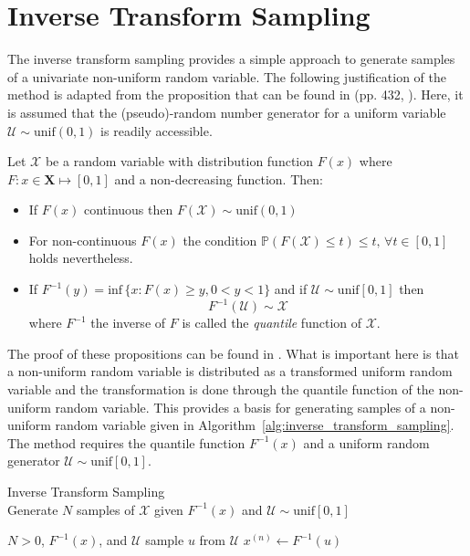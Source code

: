 \section{Inverse Transform Sampling}\label{app:its}

The inverse transform sampling provides a simple approach to generate samples of a univariate non-uniform random variable.
The following justification of the method is adapted from the proposition that can be found in (pp. 432, \cite{Lange2010}).
Here, it is assumed that the (pseudo)-random number generator for a uniform variable $\mathcal{U} \sim \text{unif}(0,1)$ is readily accessible.

Let $\mathcal{X}$ be a random variable with distribution function $F(x)$ where $F:x \in \mathbf{X} \mapsto [0,1]$ and a non-decreasing function. Then:
\begin{itemize}
	\item If $F(x)$ continuous then $F(\mathcal{X}) \sim \text{unif}(0,1)$
	\item For non-continuous $F(x)$ the condition $\mathbb{P}(F(\mathcal{X}) \leq t) \leq t, \, \forall t \in [0,1]$ holds nevertheless.
	\item If $F^{-1}(y) = \text{inf} \, \{x: F(x) \geq y, 0 < y < 1\}$ and if $\mathcal{U} \sim \text{unif}[0,1]$ then
	\begin{equation}
		F^{-1}(\mathcal{U}) \sim \mathcal{X}
	\label{eq:app_its}
	\end{equation}
	where $F^{-1}$ the inverse of $F$ is called the \emph{quantile} function of $\mathcal{X}$.
\end{itemize}
The proof of these propositions can be found in \cite{Lange2010}.
What is important here is that a non-uniform random variable is distributed as a transformed uniform random variable and the transformation is done through the quantile function of the non-uniform random variable.
This provides a basis for generating samples of a non-uniform random variable given in Algorithm~\ref{alg:inverse_transform_sampling}.
The method requires the quantile function $F^{-1}(x)$ and a uniform random generator $\mathcal{U} \sim \text{unif}[0,1]$.
 
\begin{algorithm}
\caption[Inverse Transform Sampling]{Inverse Transform Sampling \\ Generate $N$ samples of $\mathcal{X}$ given $F^{-1}(x)$ and $\mathcal{U} \sim \text{unif}[0,1]$}
\label{alg:inverse_transform_sampling}
\begin{algorithmic}
  \REQUIRE $N > 0$, $F^{-1}(x)$, and $\mathcal{U}$
    \STATE sample $u$ from $\mathcal{U}$
    \STATE $x^{(n)} \leftarrow F^{-1}(u)$
  \ENDFOR
\end{algorithmic}
\end{algorithm}


